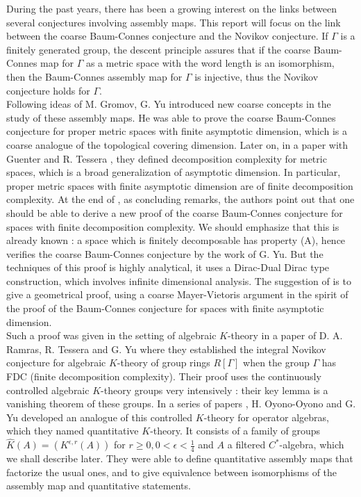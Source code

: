 
During the past years, there has been a growing interest on the links between several conjectures involving assembly maps. This report will focus on the link between the coarse Baum-Connes conjecture and the Novikov conjecture. If $\Gamma$ is a finitely generated group, the descent principle assures that if the coarse Baum-Connes map for $\Gamma$ as a metric space with the word length is an isomorphism, then the Baum-Connes assembly map for $\Gamma$ is injective, thus the Novikov conjecture holds for $\Gamma$.\\

Following ideas of M. Gromov, G. Yu introduced new coarse concepts in the study of these assembly maps. He was able to prove the coarse Baum-Connes conjecture for proper metric spaces with finite asymptotic dimension, which is a coarse analogue of the topological covering dimension. Later on, in a paper with Guenter and R. Tessera \cite{GTY}, they defined decomposition complexity for metric spaces, which is a broad generalization of asymptotic dimension. In particular, proper metric spaces with finite asymptotic dimension are of finite decomposition complexity. At the end of \cite{GTY}, as concluding remarks, the authors point out that one should be able to derive a new proof of the coarse Baum-Connes conjecture for spaces with finite decomposition complexity. We should emphasize that this is already known : a space which is finitely decomposable has property (A), hence verifies the coarse Baum-Connes conjecture by the work of G. Yu. \cite{Yu2} But the techniques of this proof is highly analytical, it uses a Dirac-Dual Dirac type construction, which involves infinite dimensional analysis. The suggestion of \cite{GTY} is to give a geometrical proof, using a coarse Mayer-Vietoris argument in the spirit of the proof of the Baum-Connes conjecture for spaces with finite asymptotic dimension.\\

Such a proof was given in the setting of algebraic $K$-theory in a paper of D. A. Ramras, R. Tessera and G. Yu where they established the integral Novikov conjecture for algebraic $K$-theory of group rings $R[\Gamma]$ when the group $\Gamma$ has FDC (finite decomposition complexity). Their proof uses the continuously controlled algebraic $K$-theory groups very intensively : their key lemma is a vanishing theorem of these groups. In a series of papers \cite{OY2}\cite{OY3}, H. Oyono-Oyono and G. Yu developed an analogue of this controlled $K$-theory for operator algebras, which they named quantitative $K$-theory. It consists of a family of groups $\hat K (A) = (K^{\epsilon,r}(A))$ for $r\geq 0,0< \epsilon <\frac{1}{4}$ and $A$ a filtered $C^*$-algebra, which we shall describe later. They were able to define quantitative assembly maps that factorize the usual ones, and to give equivalence between isomorphisms of the assembly map and quantitative statements.\\

